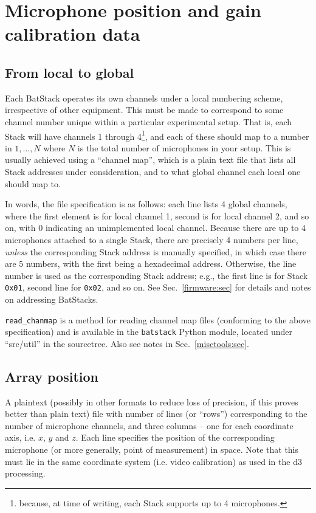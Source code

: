 \documentclass[letterpaper]{article}
\begin{document}
\section{Microphone position and gain calibration data}

\subsection{From local to global}
\label{chanmap:sec}

Each BatStack operates its own channels under a local numbering
scheme, irrespective of other equipment. This must be made to
correspond to some channel number unique within a particular
experimental setup. That is, each Stack will have channels 1 through
4\footnote{because, at time of writing, each Stack supports up to 4
  microphones.}, and each of these should map to a number in
${1,\ldots ,N}$ where $N$ is the total number of microphones in your
setup. This is usually achieved using a ``channel map'', which is a
plain text file that lists all Stack addresses under consideration,
and to what global channel each local one should map to.

In words, the file specification is as follows: each line lists 4
global channels, where the first element is for local channel 1,
second is for local channel 2, and so on, with 0 indicating an
unimplemented local channel. Because there are up to 4 microphones
attached to a single Stack, there are precisely 4 numbers per line,
\textit{unless} the corresponding Stack address is manually specified,
in which case there are 5 numbers, with the first being a hexadecimal
address. Otherwise, the line number is used as the corresponding Stack
address; e.g., the first line is for Stack \texttt{0x01}, second line
for \texttt{0x02}, and so on.  See Sec.~\ref{firmware:sec} for
details and notes on addressing BatStacks.

\texttt{read\_chanmap} is a method for reading channel map files
(conforming to the above specification) and is available in the
\texttt{batstack} Python module, located under ``src/util'' in the
sourcetree. Also see notes in Sec.~\ref{misctools:sec}.


\subsection{Array position}
\label{arrayposfile:sec}

A plaintext (possibly in other formats to reduce loss of precision, if
this proves better than plain text) file with number of lines (or
``rows'') corresponding to the number of microphone channels, and
three columns -- one for each coordinate axis, i.e. $x$, $y$ and
$z$. Each line specifies the position of the corresponding microphone
(or more generally, point of measurement) in space. Note that this
must lie in the same coordinate system (i.e. video calibration) as
used in the d3 processing.
\end{document}
